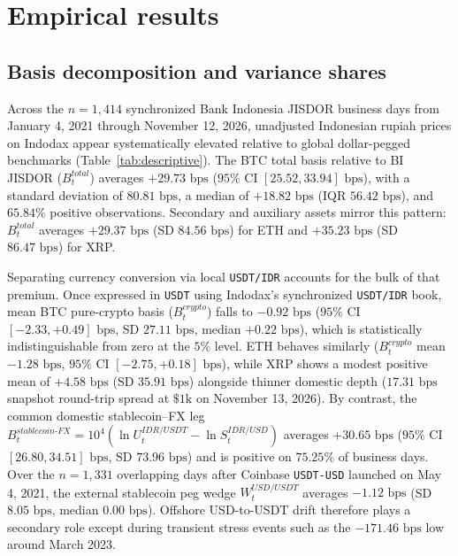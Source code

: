 \section{Empirical results}
\label{sec:results}

\subsection{Basis decomposition and variance shares}
Across the $n = 1,414$ synchronized Bank Indonesia JISDOR business days from January 4, 2021 through November 12, 2026, unadjusted Indonesian rupiah prices on Indodax appear systematically elevated relative to global dollar-pegged benchmarks (Table~\ref{tab:descriptive}). The BTC total basis relative to BI JISDOR ($B_t^{total}$) averages $+29.73\text{ bps}$ ($95\%$ CI $[25.52, 33.94]\text{ bps}$), with a standard deviation of $80.81\text{ bps}$, a median of $+18.82\text{ bps}$ (IQR $56.42\text{ bps}$), and $65.84\%$ positive observations. Secondary and auxiliary assets mirror this pattern: $B_t^{total}$ averages $+29.37\text{ bps}$ (SD $84.56\text{ bps}$) for ETH and $+35.23\text{ bps}$ (SD $86.47\text{ bps}$) for XRP.



Separating currency conversion via local \texttt{USDT/IDR} accounts for the bulk of that premium. Once expressed in \texttt{USDT} using Indodax's synchronized \texttt{USDT/IDR} book, mean BTC pure-crypto basis ($B_t^{crypto}$) falls to $-0.92\text{ bps}$ ($95\%$ CI $[-2.33, +0.49]\text{ bps}$, SD $27.11\text{ bps}$, median $+0.22\text{ bps}$), which is statistically indistinguishable from zero at the $5\%$ level. ETH behaves similarly ($B_t^{crypto}$ mean $-1.28\text{ bps}$, $95\%$ CI $[-2.75, +0.18]\text{ bps}$), while XRP shows a modest positive mean of $+4.58\text{ bps}$ (SD $35.91\text{ bps}$) alongside thinner domestic depth ($17.31\text{ bps}$ snapshot round-trip spread at $\$1\text{k}$ on November 13, 2026). By contrast, the common domestic stablecoin--FX leg $B_t^{stablecoin\text{-}FX} = 10^4(\ln U_t^{IDR/USDT} - \ln S_t^{IDR/USD})$ averages $+30.65\text{ bps}$ ($95\%$ CI $[26.80, 34.51]\text{ bps}$, SD $73.96\text{ bps}$) and is positive on $75.25\%$ of business days. Over the $n = 1,331$ overlapping days after Coinbase \texttt{USDT-USD} launched on May 4, 2021, the external stablecoin peg wedge $W_t^{USD/USDT}$ averages $-1.12\text{ bps}$ (SD $8.05\text{ bps}$, median $0.00\text{ bps}$). Offshore USD-to-USDT drift therefore plays a secondary role except during transient stress events such as the $-171.46\text{ bps}$ low around March 2023.

